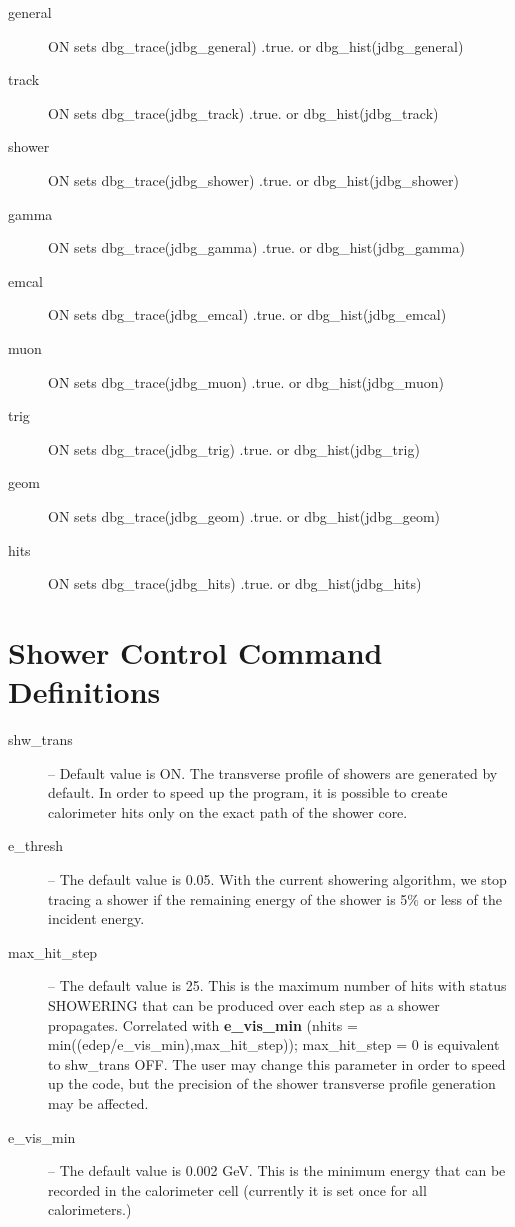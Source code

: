 \begin{description}
\item[  general] ON sets dbg\_trace(jdbg\_general) .true. or dbg\_hist(jdbg\_general) 
\item[  track]   ON sets dbg\_trace(jdbg\_track) .true. or dbg\_hist(jdbg\_track)
\item[  shower] ON sets dbg\_trace(jdbg\_shower) .true. or dbg\_hist(jdbg\_shower)
\item[  gamma] ON sets dbg\_trace(jdbg\_gamma) .true. or dbg\_hist(jdbg\_gamma)
\item[  emcal] ON sets dbg\_trace(jdbg\_emcal) .true. or dbg\_hist(jdbg\_emcal)
\item[  muon]  ON sets dbg\_trace(jdbg\_muon) .true. or dbg\_hist(jdbg\_muon)
\item[  trig]  ON sets dbg\_trace(jdbg\_trig) .true. or dbg\_hist(jdbg\_trig)
\item[  geom]  ON sets dbg\_trace(jdbg\_geom) .true. or dbg\_hist(jdbg\_geom)
\item[  hits]  ON sets dbg\_trace(jdbg\_hits) .true. or dbg\_hist(jdbg\_hits)
\end{description}

\filbreak

\section{Shower Control Command Definitions}
\begin{description}
\item[shw\_trans] -- 
     Default value is ON.  The transverse profile of showers are generated by default.
      In order to speed up the program, it is possible to create
     calorimeter hits only on the exact path of the shower core.   
\item[e\_thresh] -- 
      The default value is 0.05.  With the current showering algorithm, we stop tracing a
      shower if the remaining energy of the shower is 5\% or less of the incident energy.     
\item[max\_hit\_step] --  
The default value is 25.  This is the maximum number of
hits with status SHOWERING that can be produced over each step as a shower
propagates.  Correlated with {\bf e\_vis\_min} (nhits =
min((edep/e\_vis\_min),max\_hit\_step));  max\_hit\_step = 0 is equivalent to
shw\_trans OFF.  The user may change this parameter in order to speed up the code,
but the precision of the shower transverse profile generation may be affected.
\item[e\_vis\_min] -- 
The default value is 0.002 GeV.  This is the minimum energy
that can be recorded in the calorimeter cell (currently it is set once for all
calorimeters.) 
\end{description}

